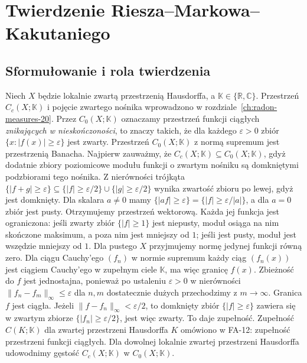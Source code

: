 \chapter{Twierdzenie Riesza--Markowa--Kakutaniego}
\label{ch:riesz-markov-21}

\providecommand{\atlasref}[2]{#2}


\section{Sformułowanie i rola twierdzenia}
Niech $X$ będzie lokalnie zwartą przestrzenią Hausdorffa,
a $\mathbb K\in\{\mathbb R,\mathbb C\}$.
Przestrzeń $C_c(X;\mathbb K)$ i pojęcie zwartego nośnika
wprowadzono w rozdziale~\ref{ch:radon-measures-20}.
Przez $C_0(X;\mathbb K)$ oznaczamy przestrzeń funkcji ciągłych
\emph{znikających w nieskończoności}, to znaczy takich, że
dla każdego $\varepsilon>0$ zbiór
$\{x:|f(x)|\ge\varepsilon\}$ jest zwarty.
Przestrzeń $C_0(X;\mathbb K)$ z normą supremum
jest przestrzenią Banacha. Najpierw zauważmy, że
$C_c(X;\mathbb K)\subseteq C_0(X;\mathbb K)$,
gdyż dodatnie zbiory poziomicowe modułu funkcji
o zwartym nośniku są domkniętymi podzbiorami tego
nośnika. Z nierówności trójkąta
$\{|f+g|\ge\varepsilon\}\subseteq
\{|f|\ge\varepsilon/2\}\cup\{|g|\ge\varepsilon/2\}$
wynika zwartość zbioru po lewej, gdyż jest domknięty.
Dla skalara $a\ne0$ mamy
$\{|af|\ge\varepsilon\}=\{|f|\ge\varepsilon/|a|\}$,
a dla $a=0$ zbiór jest pusty. Otrzymujemy przestrzeń
wektorową. Każda jej funkcja jest ograniczona:
jeśli zwarty zbiór $\{|f|\ge1\}$ jest niepusty,
moduł osiąga na nim skończone maksimum, a poza nim
jest mniejszy od $1$; jeśli jest pusty, moduł jest
wszędzie mniejszy od $1$. Dla pustego $X$
przyjmujemy normę jedynej funkcji równą zero. Dla ciągu Cauchy'ego $(f_n)$ w normie supremum
każdy ciąg $(f_n(x))$ jest ciągiem Cauchy'ego w
zupełnym ciele $\mathbb K$, ma więc granicę $f(x)$.
Zbieżność do $f$ jest jednostajna, ponieważ po ustaleniu $\varepsilon>0$ w nierówności $\|f_n-f_m\|_\infty\le\varepsilon$ dla $n,m$ dostatecznie dużych przechodzimy z $m\to\infty$. Granica $f$ jest ciągła. Jeżeli $\|f-f_n\|_\infty<\varepsilon/2$, to domknięty zbiór $\{|f|\ge\varepsilon\}$ zawiera się w zwartym zbiorze $\{|f_n|\ge\varepsilon/2\}$, jest więc zwarty. To daje zupełność.
Zupełność $C(K;\mathbb K)$ dla zwartej przestrzeni Hausdorffa $K$ omówiono w
\atlasref{FA-12::prop:ck-banach12}{FA-12: zupełność przestrzeni funkcji ciągłych}. Dla dowolnej lokalnie zwartej przestrzeni Hausdorffa udowodnimy gęstość
$C_c(X;\mathbb K)$ w $C_0(X;\mathbb K)$.

